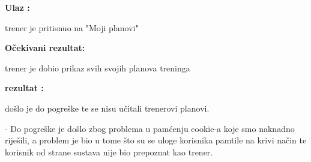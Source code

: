 	        \noindent {}
                \begin{packed_item}
						\item  \textbf{Ulaz : } 
						\item[] \begin{packed_enum}
	
							\item trener je pritisnuo na "Moji planovi"

						\end{packed_enum}
						\item  \textbf{Očekivani rezultat: } 
						\item[] \begin{packed_enum}
	
							\item trener je dobio prikaz svih svojih planova treninga

						\end{packed_enum}
						
						\item  \textbf{rezultat : }
						\item[] \begin{packed_enum}
	
							\item došlo je do pogreške te se nisu učitali trenerovi planovi.
                                                
                            - Do pogreške je došlo zbog problema u pamćenju cookie-a koje smo naknadno riješili, a problem je bio u tome što su se uloge korisnika pamtile na krivi način te korisnik od strane sustava nije bio prepoznat kao trener.
                        
						\end{packed_enum}

				\end{packed_item}

